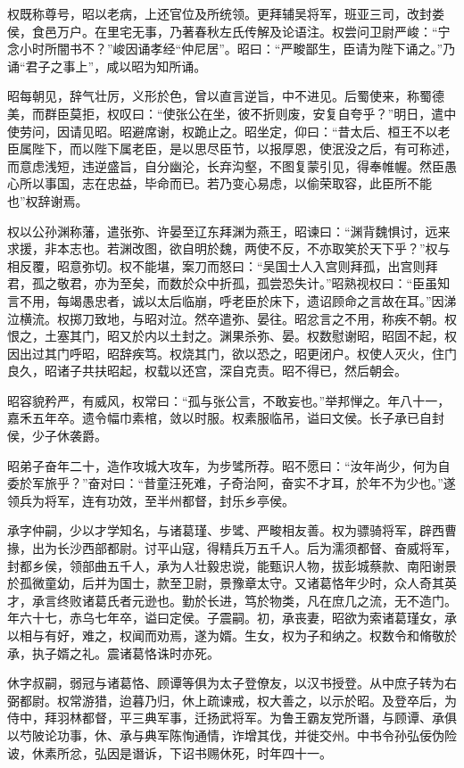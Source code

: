 \documentclass[12pt,UTF8]{ctexbook}
\begin{document}
权既称尊号，昭以老病，上还官位及所统领。更拜辅吴将军，班亚三司，改封娄侯，食邑万户。在里宅无事，乃著春秋左氏传解及论语注。权尝问卫尉严峻：“宁念小时所闇书不？”峻因诵孝经“仲尼居”。昭曰：“严畯鄙生，臣请为陛下诵之。”乃诵“君子之事上”，咸以昭为知所诵。

昭每朝见，辞气壮厉，义形於色，曾以直言逆旨，中不进见。后蜀使来，称蜀德美，而群臣莫拒，权叹曰：“使张公在坐，彼不折则废，安复自夸乎？”明日，遣中使劳问，因请见昭。昭避席谢，权跪止之。昭坐定，仰曰：“昔太后、桓王不以老臣属陛下，而以陛下属老臣，是以思尽臣节，以报厚恩，使泯没之后，有可称述，而意虑浅短，违逆盛旨，自分幽沦，长弃沟壑，不图复蒙引见，得奉帷幄。然臣愚心所以事国，志在忠益，毕命而已。若乃变心易虑，以偷荣取容，此臣所不能也”权辞谢焉。

权以公孙渊称藩，遣张弥、许晏至辽东拜渊为燕王，昭谏曰：“渊背魏惧讨，远来求援，非本志也。若渊改图，欲自明於魏，两使不反，不亦取笑於天下乎？”权与相反覆，昭意弥切。权不能堪，案刀而怒曰：“吴国士人入宫则拜孤，出宫则拜君，孤之敬君，亦为至矣，而数於众中折孤，孤尝恐失计。”昭熟视权曰：“臣虽知言不用，每竭愚忠者，诚以太后临崩，呼老臣於床下，遗诏顾命之言故在耳。”因涕泣横流。权掷刀致地，与昭对泣。然卒遣弥、晏往。昭忿言之不用，称疾不朝。权恨之，土塞其门，昭又於内以土封之。渊果杀弥、晏。权数慰谢昭，昭固不起，权因出过其门呼昭，昭辞疾笃。权烧其门，欲以恐之，昭更闭户。权使人灭火，住门良久，昭诸子共扶昭起，权载以还宫，深自克责。昭不得已，然后朝会。

昭容貌矜严，有威风，权常曰：“孤与张公言，不敢妄也。”举邦惮之。年八十一，嘉禾五年卒。遗令幅巾素棺，敛以时服。权素服临吊，谥曰文侯。长子承已自封侯，少子休袭爵。

昭弟子奋年二十，造作攻城大攻车，为步骘所荐。昭不愿曰：“汝年尚少，何为自委於军旅乎？”奋对曰：“昔童汪死难，子奇治阿，奋实不才耳，於年不为少也。”遂领兵为将军，连有功效，至半州都督，封乐乡亭侯。

承字仲嗣，少以才学知名，与诸葛瑾、步骘、严畯相友善。权为骠骑将军，辟西曹掾，出为长沙西部都尉。讨平山寇，得精兵万五千人。后为濡须都督、奋威将军，封都乡侯，领部曲五千人，承为人壮毅忠谠，能甄识人物，拔彭城蔡款、南阳谢景於孤微童幼，后并为国士，款至卫尉，景豫章太守。又诸葛恪年少时，众人奇其英才，承言终败诸葛氏者元逊也。勤於长进，笃於物类，凡在庶几之流，无不造门。年六十七，赤乌七年卒，谥曰定侯。子震嗣。初，承丧妻，昭欲为索诸葛瑾女，承以相与有好，难之，权闻而劝焉，遂为婿。生女，权为子和纳之。权数令和脩敬於承，执子婿之礼。震诸葛恪诛时亦死。

休字叔嗣，弱冠与诸葛恪、顾谭等俱为太子登僚友，以汉书授登。从中庶子转为右弼都尉。权常游猎，迨暮乃归，休上疏谏戒，权大善之，以示於昭。及登卒后，为侍中，拜羽林都督，平三典军事，迁扬武将军。为鲁王霸友党所谮，与顾谭、承俱以芍陂论功事，休、承与典军陈恂通情，诈增其伐，并徙交州。中书令孙弘佞伪险诐，休素所忿，弘因是谮诉，下诏书赐休死，时年四十一。
\end{document}
